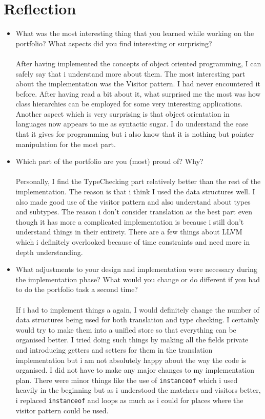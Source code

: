 \documentclass[]{tukportfolio}
\begin{document}
\part*{Reflection}

\begin{itemize}
	\item What was the most interesting thing that you learned while working on the portfolio? What aspects did you find interesting or surprising? \\\\
	After having implemented the concepts of object oriented programming, I can safely say that i understand more about them. The most interesting part about the implementation was the Visitor pattern. I had never encountered it before. After having read a bit about it, what surprised me the most was how class hierarchies can be employed for some very interesting applications. Another aspect which is very surprising is that object orientation in languages now appears to me as syntactic sugar. I do understand the ease that it gives for programming but i also know that it is nothing but pointer manipulation for the most part.
	
	\item Which part of the portfolio are you (most) proud of? Why?\\\\
	Personally, I find the TypeChecking part relatively better than the rest of the implementation. The reason is that i think I used the data structures well. I also made good use of the visitor pattern and also understand about types and subtypes. The reason i don't consider translation as the best part even though it has more a complicated implementation is because i still don't understand things in their entirety. There are a few things about LLVM which i definitely overlooked because of time constraints and need more in depth understanding.
	
	\item What adjustments to your design and implementation were necessary during the implementation phase? What would you change or do different if you had to do the portfolio task a second time?\\\\
	If i had to implement things a again, I would definitely change the number of data structures being used for both translation and type checking. I certainly would try to make them into a unified store so that everything can be organised better. I tried doing such things by making all the fields private and introducing getters and setters for them in the translation implementation but i am not absolutely happy about the way the code is organised. I did not have to make any major changes to my implementation plan. There were minor things like the use of \lstinline|instanceof| which i used heavily in the beginning but as i understood the matchers and visitors better, i replaced \lstinline|instanceof| and loops as much as i could for places where the visitor pattern could be used.
	

\end{itemize}
\end{document}
